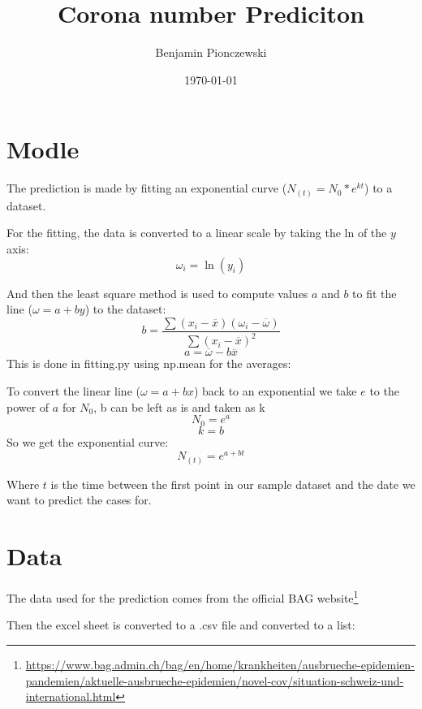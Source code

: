 \documentclass {article}
\title {Corona number Prediciton}
\author {Benjamin Pionczewski}
\date {\today {}}
\begin{document}
\maketitle
\section {Modle}

The prediction is made by fitting an exponential curve ($N_{(t)} = N_0*e^{kt}$) to a dataset.

For the fitting, the data is converted to a linear scale by taking the ln of the $y$ axis:
\[\omega_i = \ln(y_i)\]



And then the least square method is used to compute values $a$ and $b$ to fit the line ($\omega = a + by$) to the dataset:
\[ b = \frac {\sum(x_i -\overline{x})(\omega_i - \overline {\omega}) } {\sum(x_i - \overline{x})^2} \]
\[ a = \overline {\omega} - b\overline{x} \]
This is done in fitting.py using np.mean for the averages:


\newpage

To convert the linear line ($\omega = a + bx$) back to an exponential we take $e$ to the power of $a$ for $N_0$, b can be left as is and taken as k
\[N_0 = e^a \]
\[k = b\]
So we get the exponential curve:
\[ N_{(t)} = e^{a + bt} \]



Where $t$ is the time between the first point in our sample dataset and the date we want to predict the cases for.

\section {Data}
The data used for the prediction comes from the official BAG website\footnote{\url{https://www.bag.admin.ch/bag/en/home/krankheiten/ausbrueche-epidemien-pandemien/aktuelle-ausbrueche-epidemien/novel-cov/situation-schweiz-und-international.html}}

Then the excel sheet is converted to a .csv file and converted to a list:

\end{document}

